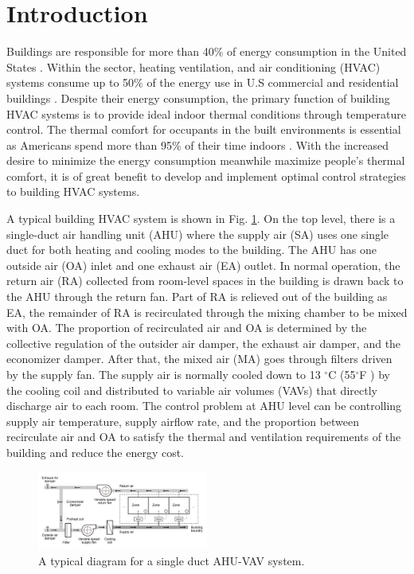 \documentclass[conference]{IEEEtran}
\begin{document}
\section{Introduction}
Buildings are responsible for more than 40\% of energy consumption in the United States \cite{eia2021energy}. Within the sector, heating ventilation, and air conditioning (HVAC) systems consume up to 50\% of the energy use in U.S commercial and residential buildings \cite{capuano2019annual}. Despite their energy consumption, the primary function of building HVAC systems is to provide ideal indoor thermal conditions through temperature control. The thermal comfort for occupants in the built environments is essential as Americans spend more than 95\% of their time indoors \cite{bls2021indoor}. With the increased desire to minimize the energy consumption meanwhile maximize people's thermal comfort, it is of great benefit to develop and implement optimal control strategies to building HVAC systems.

A typical building HVAC system is shown in Fig. \ref{fig1}. On the top level, there is a single-duct air handling unit (AHU) where the supply air (SA) uses one single duct for both heating and cooling modes to the building. The AHU has one outside air (OA) inlet and one exhaust air (EA) outlet. In normal operation, the return air (RA) collected from room-level spaces in the building is drawn back to the AHU through the return fan. Part of RA is relieved out of the building as EA, the remainder of RA is recirculated through the mixing chamber to be mixed with OA. The proportion of recirculated air and OA is determined by the collective regulation of the outsider air damper, the exhaust air damper, and the economizer damper. After that, the mixed air (MA) goes through filters driven by the supply fan. The supply air is normally cooled down to 13 $^{\circ}$C (55$^{\circ}$F ) by the cooling coil and distributed to variable air volumes (VAVs) that directly discharge air to each room. The control problem at AHU level can be controlling supply air temperature, supply airflow rate, and the proportion between recirculate air and OA to satisfy the thermal and ventilation requirements of the building and reduce the energy cost. 

\begin{figure}[htbp]
\centerline{\includegraphics[width=0.5\textwidth]{Figures/AHU-VAV system.jpeg}}
\caption{A typical diagram for a single duct AHU-VAV system.}
\label{fig1}
\end{figure}
\end{document}
